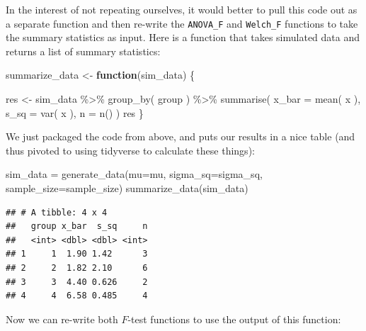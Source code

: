 \documentclass[
]{book}
\newenvironment{Shaded}{\begin{snugshade}}{\end{snugshade}}
\newcommand{\AttributeTok}[1]{\textcolor[rgb]{0.77,0.63,0.00}{#1}}
\newcommand{\ControlFlowTok}[1]{\textcolor[rgb]{0.13,0.29,0.53}{\textbf{#1}}}
\newcommand{\FunctionTok}[1]{\textcolor[rgb]{0.00,0.00,0.00}{#1}}
\newcommand{\NormalTok}[1]{#1}
\newcommand{\OtherTok}[1]{\textcolor[rgb]{0.56,0.35,0.01}{#1}}
\newcommand{\SpecialCharTok}[1]{\textcolor[rgb]{0.00,0.00,0.00}{#1}}
\begin{document}
In the interest of not repeating ourselves, it would better to pull this code out as a separate function and then re-write the \texttt{ANOVA\_F} and \texttt{Welch\_F} functions to take the summary statistics as input. Here is a function that takes simulated data and returns a list of summary statistics:

\begin{Shaded}
\begin{Highlighting}[]
\NormalTok{summarize\_data }\OtherTok{\textless{}{-}} \ControlFlowTok{function}\NormalTok{(sim\_data) \{}
  
\NormalTok{  res }\OtherTok{\textless{}{-}}\NormalTok{ sim\_data }\SpecialCharTok{\%\textgreater{}\%} \FunctionTok{group\_by}\NormalTok{( group ) }\SpecialCharTok{\%\textgreater{}\%}
    \FunctionTok{summarise}\NormalTok{( }\AttributeTok{x\_bar =} \FunctionTok{mean}\NormalTok{( x ),}
               \AttributeTok{s\_sq =} \FunctionTok{var}\NormalTok{( x ),}
               \AttributeTok{n =} \FunctionTok{n}\NormalTok{() )}
\NormalTok{  res}
\NormalTok{\}}
\end{Highlighting}
\end{Shaded}

We just packaged the code from above, and puts our results in a nice table (and thus pivoted to using tidyverse to calculate these things):

\begin{Shaded}
\begin{Highlighting}[]
\NormalTok{sim\_data }\OtherTok{=} \FunctionTok{generate\_data}\NormalTok{(}\AttributeTok{mu=}\NormalTok{mu, }\AttributeTok{sigma\_sq=}\NormalTok{sigma\_sq, }\AttributeTok{sample\_size=}\NormalTok{sample\_size)}
\FunctionTok{summarize\_data}\NormalTok{(sim\_data)}
\end{Highlighting}
\end{Shaded}

\begin{verbatim}
## # A tibble: 4 x 4
##   group x_bar  s_sq     n
##   <int> <dbl> <dbl> <int>
## 1     1  1.90 1.42      3
## 2     2  1.82 2.10      6
## 3     3  4.40 0.626     2
## 4     4  6.58 0.485     4
\end{verbatim}

Now we can re-write both \(F\)-test functions to use the output of this function:
\end{document}
